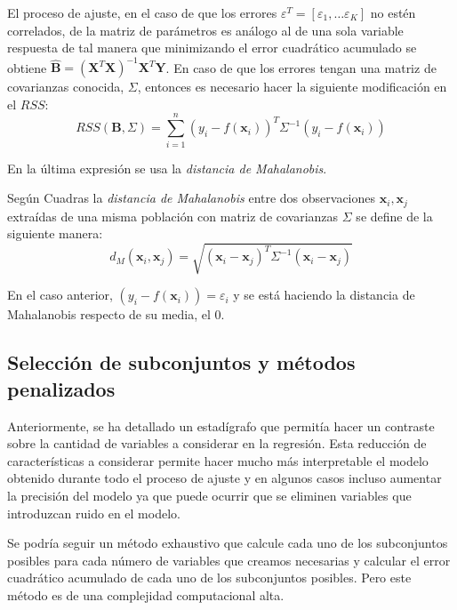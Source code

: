 \noindent El proceso de ajuste, en el caso de que los errores $\varepsilon^T=[\varepsilon_1,\ldots \varepsilon_K]$ no estén correlados, de la matriz de parámetros es análogo al de una sola variable respuesta de tal manera que minimizando el error cuadrático acumulado se obtiene $\hat{\textbf{B}}=(\textbf{X}^T\textbf{X})^{-1}\textbf{X}^T\textbf{Y}$. En caso de que los errores tengan una matriz de covarianzas conocida, $\Sigma$, entonces es necesario hacer la siguiente modificación en el $RSS$:
\begin{equation}
RSS(\textbf{B},\Sigma)=\sum_{i=1}^n(y_i-f(\textbf{x}_i))^T \Sigma^{-1} (y_i-f(\textbf{x}_i))
\end{equation}

\noindent En la última expresión se usa la \textit{distancia de Mahalanobis}.
\begin{defi}
Según Cuadras \cite{Cuadras 2014} la \textit{distancia de Mahalanobis} entre dos observaciones $\textbf{x}_i, \textbf{x}_j$ extraídas de una misma población con matriz de covarianzas $\Sigma$ se define de la siguiente manera: 
\begin{equation}
d_M(\textbf{x}_i, \textbf{x}_j)=\sqrt{(\textbf{x}_i- \textbf{x}_j)^T \Sigma^{-1}(\textbf{x}_i-\textbf{x}_j)}
\end{equation}
\end{defi}

\noindent En el caso anterior, $(y_i-f(\textbf{x}_i))=\varepsilon_i$ y se está haciendo la distancia de Mahalanobis respecto de su media, el 0. 


\subsection{Selección de subconjuntos y métodos penalizados}

\noindent Anteriormente, se ha detallado un estadígrafo que permitía hacer un contraste sobre la cantidad de variables a considerar en la regresión. 
Esta reducción de características a considerar permite hacer mucho más interpretable el modelo obtenido durante todo el proceso de ajuste y en algunos casos incluso aumentar la precisión del modelo ya que puede ocurrir que se eliminen variables que introduzcan ruido en el modelo. 

\noindent Se podría seguir un método exhaustivo que calcule cada uno de los subconjuntos posibles para cada número de variables que creamos necesarias y calcular el error cuadrático acumulado de cada uno de los subconjuntos posibles. Pero este método es de una complejidad computacional alta. 

